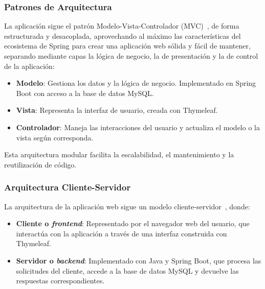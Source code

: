 \subsubsection{Patrones de Arquitectura}
La aplicación sigue el patrón Modelo-Vista-Controlador (MVC)~\cite{modelo-vista-controrlador}, de forma estructurada y desacoplada, aprovechando al máximo las características del ecosistema de Spring para crear una aplicación web sólida y fácil de mantener, separando mediante capas la lógica de negocio, la de presentación y la de control de la aplicación:
\begin{itemize}
\tightlist
   \item \textbf{Modelo}: Gestiona los datos y la lógica de negocio. Implementado en Spring Boot con acceso a la base de datos MySQL.
   \item \textbf{Vista}: Representa la interfaz de usuario, creada con Thymeleaf.
   \item \textbf{Controlador}: Maneja las interacciones del usuario y actualiza el modelo o la vista según corresponda.
\end{itemize}
Esta arquitectura modular facilita la escalabilidad, el mantenimiento y la reutilización de código.

\subsubsection{Arquitectura Cliente-Servidor}
La arquitectura de la aplicación web sigue un modelo cliente-servidor~\cite{client-server-model}, donde:
\begin{itemize}
\tightlist
   \item \textbf{Cliente o \emph{frontend}}: Representado por el navegador web del usuario, que interactúa con la aplicación a través de una interfaz construida con Thymeleaf.
   \item \textbf{Servidor o \emph{backend}}: Implementado con Java y Spring Boot, que procesa las solicitudes del cliente, accede a la base de datos MySQL y devuelve las respuestas correspondientes.
\end{itemize}

